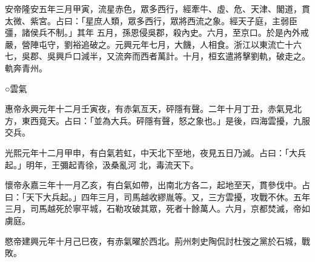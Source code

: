 \begin{pinyinscope}
 安帝隆安五年三月甲寅，流星赤色，眾多西行，經牽牛、虛、危、天津、閣道，貫太微、紫宮。占曰：「星庶人類，眾多西行，眾將西流之象。經天子庭，主弱臣彊，諸侯兵不制。」其年
 五月，孫恩侵吳郡，殺內史。六月，至京口。於是內外戒嚴，營陣屯守，劉裕追破之。元興元年七月，大饑，人相食。浙江以東流亡十六七，吳郡、吳興戶口減半，又流奔而西者萬計。十月，桓玄遣將擊劉軌，破走之。軌奔青州。



 ○雲氣



 惠帝永興元年十二月壬寅夜，有赤氣亙天，砰隱有聲。二年十月丁丑，赤氣見北方，東西竟天。占曰：「並為大兵。砰隱有聲，怒之象也。」是後，四海雲擾，九服交兵。



 光熙元年十二月甲申，有白氣若虹，中天北下至地，夜見五日乃滅。占曰：「大兵起。」明年，王彌起青徐，汲桑亂河
 北，毒流天下。



 懷帝永嘉三年十一月乙亥，有白氣如帶，出南北方各二，起地至天，貫參伐中。占曰：「天下大兵起。」四年三月，司馬越收繆胤等。又，三方雲擾，攻戰不休。五年三月，司馬越死於寧平城，石勒攻破其眾，死者十餘萬人。六月，京都焚滅，帝如虜庭。



 愍帝建興元年十月己巳夜，有赤氣曜於西北。荊州刺史陶侃討杜弢之黨於石城，戰敗。



\end{pinyinscope}